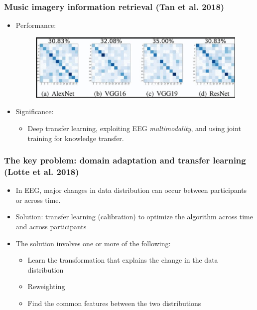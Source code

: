 \documentclass{beamer}
\begin{document}
\begin{frame}
	\frametitle{Music imagery information retrieval (Tan et al. 2018)}
	
	\begin{itemize}
		\item Performance:
		\begin{figure}
			\centering
			\includegraphics[scale=0.45]{fig10.jpg}
		\end{figure}
	
		\item Significance:
		\begin{itemize}
			\item Deep transfer learning, exploiting EEG \textit{multimodality}, and using joint training for knowledge transfer.
		\end{itemize}	
	
	\end{itemize}

\end{frame}

\begin{frame}
	\frametitle{The key problem: domain adaptation and transfer learning (Lotte et al. 2018)}
	
	\begin{itemize}

		\item In EEG, major changes in data distribution can occur between participants or across time.

		\item Solution: transfer learning (calibration) to optimize the algorithm across time and across participants

		\item The solution involves one or more of the following:
		\begin{itemize}
			\item Learn the transformation that explains the change in the data distribution
			\item Reweighting
			\item Find the common features between the two distributions
		\end{itemize}

	\end{itemize}

\end{frame}
\end{document}
